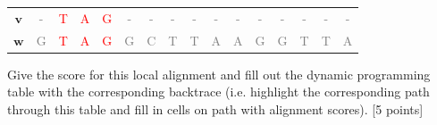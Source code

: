 \begin{enumerate}
\begin{enumerate}



\begin{center}
\begin{tabular}{ c | c c c c c c c c c c c c c c c } 
$\mathbf{v}$ & \textcolor{gray}{-} & \textcolor{red}{T} & \textcolor{red}{A} & \textcolor{red}{G}	&\textcolor{gray}{-}&	\textcolor{gray}{-}&	\textcolor{gray}{-} &	\textcolor{gray}{-} &	\textcolor{gray}{-} & \textcolor{gray}{-}	& \textcolor{gray}{-} &	\textcolor{gray}{-} &	\textcolor{gray}{-} &	\textcolor{gray}{-} &	\textcolor{gray}{-}\\
$\mathbf{w}$ & \textcolor{gray}{G} & \textcolor{red}{T} & \textcolor{red}{A} & \textcolor{red}{G} & \textcolor{gray}{G} & \textcolor{gray}{C} & \textcolor{gray}{T} & \textcolor{gray}{T} & \textcolor{gray}{A} & \textcolor{gray}{A} &	\textcolor{gray}{G} &	\textcolor{gray}{G} &	\textcolor{gray}{T} &	\textcolor{gray}{T} &	\textcolor{gray}{A}\\
\end{tabular}
\end{center}

Give the score for this local alignment and fill out the dynamic programming table with the corresponding backtrace (i.e. highlight the corresponding path through this table and fill in cells on path with alignment scores). [5 points]

\vspace{.5cm}

\fbox{\parbox{\linewidth}{


}}
\end{enumerate}
\end{enumerate}
